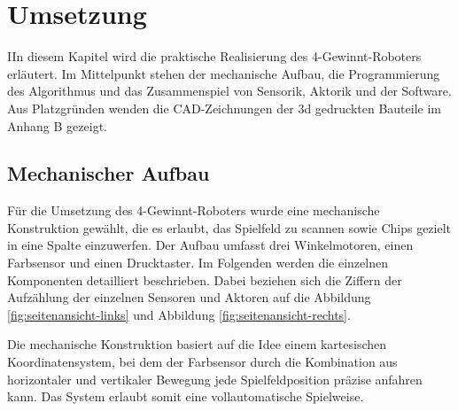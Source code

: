\chapter{ Umsetzung}
\label{cha:Umsetzung}
IIn diesem Kapitel wird die praktische Realisierung des 4-Gewinnt-Roboters erläutert. Im Mittelpunkt stehen der mechanische Aufbau, die Programmierung des Algorithmus und das Zusammenspiel von Sensorik, Aktorik und der Software. Aus Platzgründen wenden die CAD-Zeichnungen der 3d gedruckten Bauteile im Anhang B gezeigt.

\section{Mechanischer Aufbau}
Für die Umsetzung des 4-Gewinnt-Roboters wurde eine mechanische Konstruktion gewählt, die es erlaubt, das Spielfeld zu scannen sowie Chips gezielt in eine Spalte einzuwerfen. Der Aufbau umfasst drei Winkelmotoren, einen Farbsensor und einen Drucktaster. Im Folgenden werden die einzelnen Komponenten detailliert beschrieben. Dabei beziehen sich die Ziffern der Aufzählung der einzelnen Sensoren und Aktoren auf die Abbildung \ref{fig:seitenansicht-links} und Abbildung \ref{fig:seitenansicht-rechts}.

Die mechanische Konstruktion basiert auf die Idee einem kartesischen Koordinatensystem, bei dem der Farbsensor durch die Kombination aus horizontaler und vertikaler Bewegung jede Spielfeldposition präzise anfahren kann. Das System erlaubt somit eine vollautomatische Spielweise.


